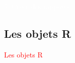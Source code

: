 \documentclass[11pt]{beamer}\usepackage[]{graphicx}\usepackage[]{color}
\begin{document}
\begin{frame}[plain]
\hspace*{-1.0cm}\parbox[t]{\textwidth}{
 \begin{center}
  \Huge{\textcolor{white}{5. Cr\'{e}er des rapports}}
 \end{center}
 }
\end{frame}

\subsection{Les objets R}

\begin{frame}
 \begin{center}
  \Huge{\textcolor{red}{Les objets R}}
 \end{center}
\end{frame}
\end{document}
